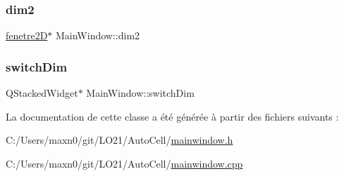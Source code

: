 \mbox{\label{class_main_window_a5cca01b10bb0e1ed6114418f385cb150}} 
\subsubsection{\texorpdfstring{dim2}{dim2}}
{\footnotesize\ttfamily \mbox{\hyperlink{classfenetre2_d}{fenetre2D}}$\ast$ Main\+Window\+::dim2\hspace{0.3cm}{\ttfamily [private]}}

\mbox{\label{class_main_window_a825afdd9ee093af845c568d1c50de6d4}} 
\subsubsection{\texorpdfstring{switch\+Dim}{switchDim}}
{\footnotesize\ttfamily Q\+Stacked\+Widget$\ast$ Main\+Window\+::switch\+Dim\hspace{0.3cm}{\ttfamily [private]}}



La documentation de cette classe a été générée à partir des fichiers suivants \+:\begin{DoxyCompactItemize}
\item 
C\+:/\+Users/maxn0/git/\+L\+O21/\+Auto\+Cell/\mbox{\hyperlink{mainwindow_8h}{mainwindow.\+h}}\item 
C\+:/\+Users/maxn0/git/\+L\+O21/\+Auto\+Cell/\mbox{\hyperlink{mainwindow_8cpp}{mainwindow.\+cpp}}\end{DoxyCompactItemize}
